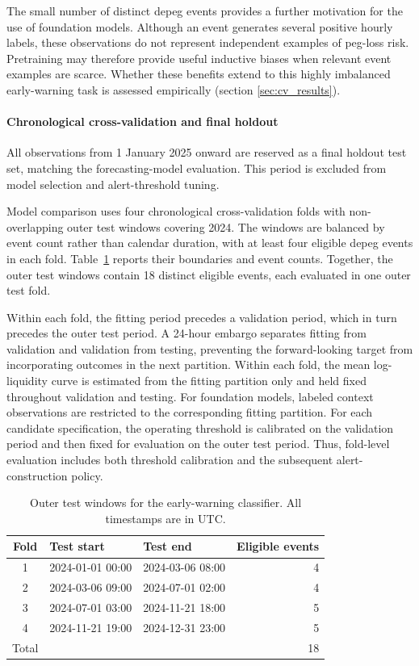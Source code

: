 \documentclass[a4paper,fleqn]{cas-sc}
\begin{document}
The small number of distinct depeg events provides a further motivation for the use of foundation models. Although an event generates several positive hourly labels, these observations do not represent independent examples of peg-loss risk. Pretraining may therefore provide useful inductive biases when relevant event examples are scarce. Whether these benefits extend to this highly imbalanced early-warning task is assessed empirically (section \ref{sec:cv_results}).

\paragraph{Chronological cross-validation and final holdout}

All observations from 1 January 2025 onward are reserved as a final holdout test set, matching the forecasting-model evaluation. This period is excluded from model selection and alert-threshold tuning.

Model comparison uses four chronological cross-validation folds with non-overlapping outer test windows covering 2024. The windows are balanced by event count rather than calendar duration, with at least four eligible depeg events in each fold.
Table~\ref{tab:classifier_cv} reports their boundaries and event counts. Together, the outer test windows contain 18 distinct eligible events, each evaluated in one outer test fold.

Within each fold, the fitting period precedes a validation period,
which in turn precedes the outer test period. A 24-hour embargo
separates fitting from validation and validation from testing,
preventing the forward-looking target from incorporating outcomes
in the next partition. Within each fold, the mean log-liquidity curve is estimated from the fitting partition only and held fixed throughout validation and testing. For foundation models, labeled context
observations are restricted to the corresponding fitting partition.
For each candidate specification, the operating threshold is
calibrated on the validation period and then fixed for evaluation
on the outer test period. Thus, fold-level evaluation includes both
threshold calibration and the subsequent alert-construction policy.

\begin{table}[pos=!htbp,align=\centering]
    \centering
    \small
    \caption{Outer test windows for the early-warning classifier.
    All timestamps are in UTC.}
    \label{tab:classifier_cv}
    \begin{tabular}{cllr}
        \hline
        Fold & Test start & Test end & Eligible events \\
        \hline
        1 & 2024-01-01 00:00 & 2024-03-06 08:00 & 4 \\
        2 & 2024-03-06 09:00 & 2024-07-01 02:00 & 4 \\
        3 & 2024-07-01 03:00 & 2024-11-21 18:00 & 5 \\
        4 & 2024-11-21 19:00 & 2024-12-31 23:00 & 5 \\
        \hline
        Total & & & 18 \\
        \hline
    \end{tabular}
\end{table}
\end{document}
